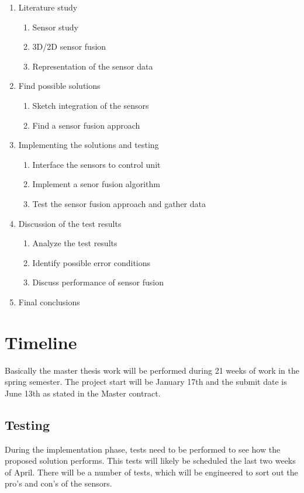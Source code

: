 \documentclass[a4paper, 10pt]{article}
\begin{document}
\begin{enumerate}
    \item Literature study
        \begin{enumerate}
            \item Sensor study
            \item 3D/2D sensor fusion
            \item Representation of the sensor data
        \end{enumerate}
    \item Find possible solutions
        \begin{enumerate}
            \item Sketch integration of the sensors
            \item Find a sensor fusion approach
        \end{enumerate}
    \item Implementing the solutions and testing
        \begin{enumerate}
            \item Interface the sensors to control unit
            \item Implement a senor fusion algorithm
            \item Test the sensor fusion approach and gather data
        \end{enumerate}
    \item Discussion of the test results
        \begin{enumerate}
            \item Analyze the test results
            \item Identify possible error conditions
            \item Discuss performance of sensor fusion
        \end{enumerate}
    \item Final conclusions
\end{enumerate}


\section{Timeline}
Basically the master thesis work will be performed during 21 weeks of work in the spring
semester. The project start will be January 17th and the submit date is June 13th as stated in the
Master contract. 

\subsection{Testing}
During the implementation phase, tests need to be performed to see how the proposed
solution performs. This tests will likely be scheduled the last two weeks of April. There will be a number of
tests, which will be engineered to sort out the pro's and con's of the sensors. 
\end{document}

